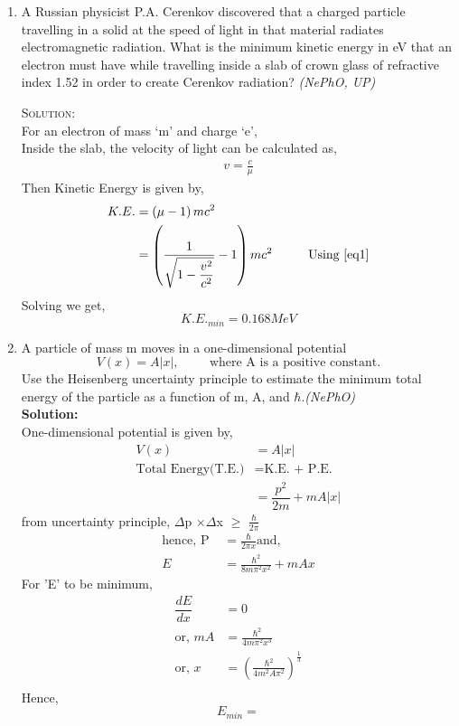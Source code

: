 \begin{enumerate}

\item A Russian physicist P.A. Cerenkov discovered that a charged particle travelling in a solid at the speed of light in that material radiates electromagnetic radiation. What is the minimum kinetic energy in eV that an electron must have while travelling inside a slab of crown glass of refractive index 1.52 in order to create Cerenkov radiation? \hfill \textsl{(NePhO, UP)}

\textsc{Solution:}\\
For an electron of mass ‘m’ and charge ‘e’,\\
Inside the slab, the velocity of light can be calculated as,
\begin{align*}
v = \frac{c}{\mu}
\end{align*}
Then Kinetic Energy is given by,
\begin{align*}
    K.E.&= \left(\mu-1\right)mc^2\\
    &= \left(\frac{\displaystyle 1}{\displaystyle \sqrt{1-\frac{v^2}{c^2}}}-1\right)mc^2 \hspace{1cm} \text{Using \eqref{eq1}}
\end{align*}
Solving we get,
\[
K.E._{min}= 0.168 MeV
\]

\item A particle of mass m moves in a one-dimensional potential
\[
V(x) = A\mathopen|x\mathclose|,\hspace{1cm} \text{where A is a positive constant.}
\]
Use the Heisenberg uncertainty principle to estimate the minimum total energy of the particle as a function of m, A, and $\hbar$.\hfill \textsl{(NePhO)}
\\
\textbf{Solution:}\\
One-dimensional potential is given by,
\begin{align*}
V(x) &= A\mathopen|x\mathclose|      \label{eq4}\\
\text{Total Energy(T.E.)} &= \text{K.E. + P.E.}\\
&= \dfrac{p^2}{2m} + mA\mathopen|x\mathclose|
\end{align*}
from uncertainty principle, $\Delta$p $\times \Delta$x $\geq$ $\frac{\hbar}{2\pi}$\\
\begin{align*}
    \text{hence, P } &= \frac{\hbar}{2\pi x} \text{and, }\\
    E &= \frac{\hbar^2}{8m\pi^2x^2} +  mAx 
\end{align*}
For 'E' to be minimum, 
\begin{align*}
    \dfrac{dE}{dx} &= 0\\
    \text{or, }mA &=  \frac{\hbar^2}{4m\pi^2x^3}\\
    \text{or, }x &= \left(\frac{\hbar^2}{4m^2A\pi^2}\right)^\frac{1}{3}\\
\end{align*}
Hence, \\
\[E_{min} = \]


\end{enumerate}
